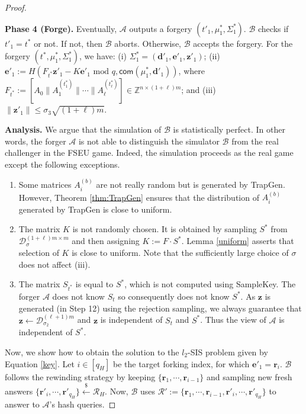 \documentclass[runningheads]{llncs}
\def\ZZ{\mathbb{Z}}
\def\cal{\mathcal}
\def\bf{\mathbf}
\begin{document}
\begin{proof}
\begin{description}
\item \textbf{Phase 4 (Forge).} Eventually, $\cal{A}$ outputs a forgery $( t'_1, \mu^*_1, \Sigma_1^* )$. 
$\cal{B}$ checks if $t'_1=t^*$ or not. If not, then $\cal{B}$ aborts. 
Otherwise, $\cal{B}$ accepts the forgery. 
For the forgery $( t^*, \mu^*_1, \Sigma_1^* )$, we have: 
(i) $\Sigma_1^*=(\mathbf{d}'_1,\mathbf{e}'_1, \mathbf{z}'_1 )$; 
(ii)   $\mathbf{e}'_1:=H(F_{t^*}\mathbf{z'}_1- K\mathbf{e}'_1 \text{ mod } q, \textsf{com}(\mu^*_1, \textbf{d}'_1))$, 
where $F_{t^*}:=\left[A_0\| A_1^{(t^*_1)} \| \cdots \|A_\ell^{(t^*_\ell)} \right] \in \ZZ^{n \times (1+\ell) m}$; and 
(iii)  $\|\mathbf{z'}_1\| \le \sigma_3\sqrt{(1+\ell)m}$.\\
\end{description}

\noindent \textbf{Analysis.} 
We argue that the simulation of $\cal{B}$  is  statistically perfect. 
In other words, the forger $\cal{A}$  is not able to distinguish the 
simulator $\cal{B}$ from the real challenger in the \textsf{FSEU} game.
Indeed, the simulation proceeds as the real game except the following exceptions.
\vspace{-2mm}
\begin{enumerate}[label=(\roman*)]
\item Some matrices $A^{(b)}_i$ are not really random but is generated by \textsf{TrapGen}.
	However, Theorem \ref{thm:TrapGen} ensures that the distribution of $A^{(b)}_i$
	generated by \textsf{TrapGen} is close to uniform.
\item The matrix $K$ is not randomly chosen. It is obtained by sampling  $S^*$ from $\cal{D}_\sigma^{(1+\ell)m\times m}$
	and then assigning $K:=F\cdot S^*$. Lemma \ref{uniform} asserts that selection of $K$ is close to uniform. 
	Note that the sufficiently large choice of $\sigma$ does not affect (iii).
\item The matrix $S_{t^*}$ is equal to $S^*$, which is not computed using \textsf{SampleKey}.  
	The forger $\cal{A}$ does not know $S_t$ so consequently does not know $S^*$. 
	As $\bf{z}$ is generated (in Step 12) using the rejection sampling, 
	we always guarantee that $\bf{z}\leftarrow \cal{D}_{\sigma_2}^{(\ell+1)m}$ and $\bf{z}$ 
	is independent of $S_t$ and $S^*$. 
	Thus the view of $\cal{A}$ is independent of $S^*$.
\end{enumerate}
\vspace{-2mm}
Now, we show how to obtain the solution to the $l_2$-\textsf{SIS} problem given by Equation \eqref{key}. 
Let $i \in [q_H]$ be the target forking index, for which $\mathbf{e}'_1=\mathbf{r}_i$. 
$\mathcal{B}$ follows the rewinding strategy by keeping $\{\mathbf{r}_{1}, \cdots, \mathbf{r}_{i-1}\}$ 
and sampling new fresh answers $\{\mathbf{r}'_{i}, \cdots, \mathbf{r}'_{q_H}\} \xleftarrow{\$} \cal{R}_H$. Now,
$\mathcal{B}$ uses $\mathcal{R}':=\{\mathbf{r}_1, \cdots, \mathbf{r}_{i-1}, \mathbf{r}'_{i}, \cdots, \mathbf{r}'_{q_H} \}$
to answer to $\cal{A}$'s hash queries.
 

\end{proof}
\end{document}
